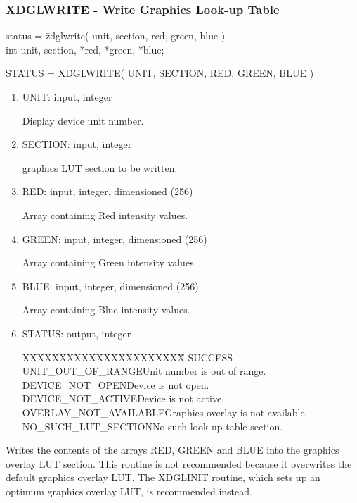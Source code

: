 \subsubsection{XDGLWRITE - Write Graphics Look-up Table}
\begin{tabbing}
status = \=zdglwrite( unit, section, red, green, blue )\\
\>int  unit, section, *red, *green, *blue;\\
\end{tabbing}
STATUS = XDGLWRITE( UNIT, SECTION, RED, GREEN, BLUE )
\begin{enumerate}
\item UNIT:  input, integer

Display device unit number.
\item SECTION:  input, integer

graphics LUT section to be written.
\item RED:  input, integer, dimensioned (256)

Array containing Red intensity values.
\item GREEN:  input, integer, dimensioned (256)

Array containing Green intensity values.
\item BLUE:  input, integer, dimensioned (256)

Array containing Blue intensity values.
\item STATUS:  output, integer
\begin{tabbing}
XXXXXXXXXXXXXXXXXXXXXX\=\kill
SUCCESS\\
UNIT\_OUT\_OF\_RANGE\>Unit number is out of range.\\
DEVICE\_NOT\_OPEN\>Device is not open.\\
DEVICE\_NOT\_ACTIVE\>Device is not active.\\
OVERLAY\_NOT\_AVAILABLE\>Graphics overlay is not available.\\
NO\_SUCH\_LUT\_SECTION\>No such look-up table section.\\
\end{tabbing}
\end{enumerate}
Writes the contents of the arrays RED, GREEN and BLUE into the
graphics overlay LUT section.  This routine is not recommended
because it overwrites the default graphics overlay LUT.  The
XDGLINIT routine, which sets up an optimum graphics overlay LUT,
is recommended instead.
\newpage
